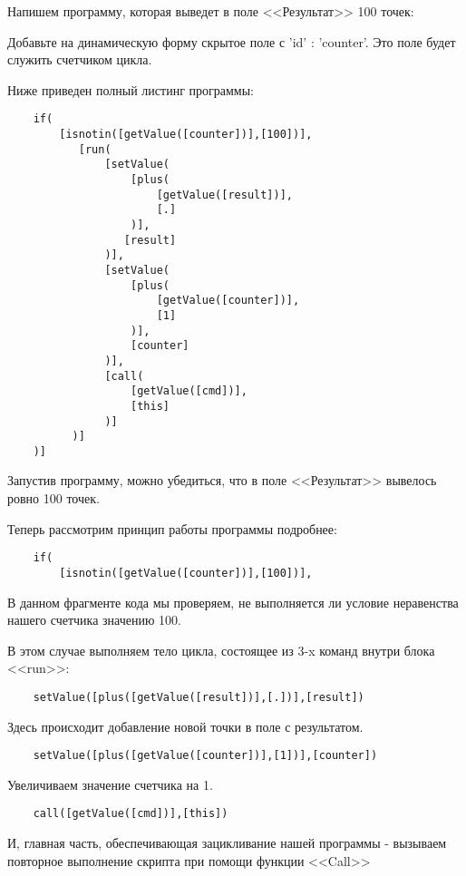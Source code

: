 \documentclass[10pt]{book}
\begin{document}
	Напишем программу, которая выведет в поле <<Результат>> 100 точек:
	
	Добавьте  на динамическую форму скрытое поле с 'id' : 'counter'. Это поле будет служить счетчиком цикла.
	
	Ниже приведен полный листинг программы:
	
	\begin{verbatim}
	if(
	    [isnotin([getValue([counter])],[100])],
	       [run(
	           [setValue(
	               [plus(
	                   [getValue([result])],
	                   [.]
                   )],
	              [result]
	           )],
               [setValue(
	               [plus(
	                   [getValue([counter])],
	                   [1]
	               )],
	               [counter]
	           )],
	           [call(
	               [getValue([cmd])],
	               [this]
	           )]
	      )]
	)]
	\end{verbatim}
	
	Запустив программу, можно убедиться, что в поле <<Результат>> вывелось ровно 100 точек.
	
	Теперь рассмотрим принцип работы программы подробнее:
	
	\begin{verbatim}
	if(
	    [isnotin([getValue([counter])],[100])],
	\end{verbatim}
	
	В данном фрагменте кода мы проверяем, не выполняется ли условие неравенства нашего счетчика значению 100.
	
	В этом случае выполняем тело цикла, состоящее из 3-x команд внутри блока <<run>>:
	
	\begin{verbatim}
	setValue([plus([getValue([result])],[.])],[result])
	\end{verbatim}
	
	Здесь происходит добавление новой точки в поле с результатом.
	
	\begin{verbatim}
	setValue([plus([getValue([counter])],[1])],[counter])
	\end{verbatim}
	
	Увеличиваем значение счетчика на 1.
	
	\begin{verbatim}
	call([getValue([cmd])],[this])
	\end{verbatim}
	
	И, главная часть, обеспечивающая зацикливание нашей программы - вызываем повторное выполнение скрипта при помощи функции
	<<Call>>
	
\end{document}
